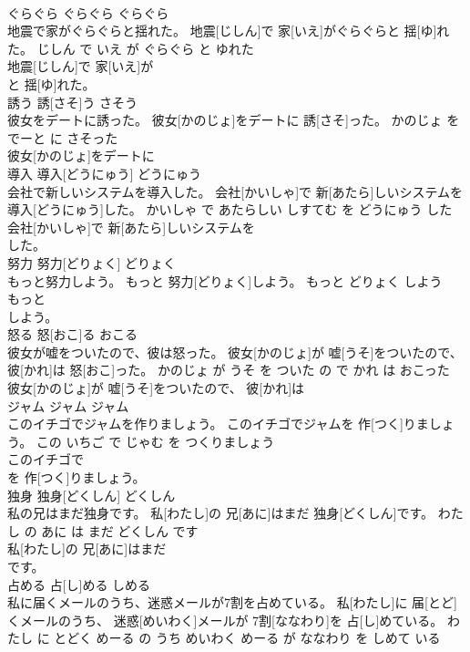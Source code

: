 \documentclass[8pt]{extreport}
\begin{document}
\begin{CJK}{UTF8}{min}
\\	ぐらぐら	ぐらぐら	ぐらぐら	
\\	地震で家がぐらぐらと揺れた。	地震[じしん]で 家[いえ]がぐらぐらと 揺[ゆ]れた。	じしん で いえ が ぐらぐら と ゆれた	
\\	地震[じしん]で 家[いえ]が
\\	と 揺[ゆ]れた。		
\\	誘う	誘[さそ]う	さそう	
\\	彼女をデートに誘った。	彼女[かのじょ]をデートに 誘[さそ]った。	かのじょ を でーと に さそった	
\\	彼女[かのじょ]をデートに
\\	導入	導入[どうにゅう]	どうにゅう	
\\	会社で新しいシステムを導入した。	会社[かいしゃ]で 新[あたら]しいシステムを 導入[どうにゅう]した。	かいしゃ で あたらしい しすてむ を どうにゅう した	
\\	会社[かいしゃ]で 新[あたら]しいシステムを
\\	した。		
\\	努力	努力[どりょく]	どりょく	
\\	もっと努力しよう。	もっと 努力[どりょく]しよう。	もっと どりょく しよう	
\\	もっと
\\	しよう。		
\\	怒る	怒[おこ]る	おこる	
\\	彼女が嘘をついたので、彼は怒った。	彼女[かのじょ]が 嘘[うそ]をついたので、 彼[かれ]は 怒[おこ]った。	かのじょ が うそ を ついた の で かれ は おこった	
\\	彼女[かのじょ]が 嘘[うそ]をついたので、 彼[かれ]は
\\	ジャム	ジャム	ジャム	
\\	このイチゴでジャムを作りましょう。	このイチゴでジャムを 作[つく]りましょう。	この いちご で じゃむ を つくりましょう	
\\	このイチゴで
\\	を 作[つく]りましょう。		
\\	独身	独身[どくしん]	どくしん	
\\	私の兄はまだ独身です。	私[わたし]の 兄[あに]はまだ 独身[どくしん]です。	わたし の あに は まだ どくしん です	
\\	私[わたし]の 兄[あに]はまだ
\\	です。		
\\	占める	占[し]める	しめる	
\\	私に届くメールのうち、迷惑メールが7割を占めている。	私[わたし]に 届[とど]くメールのうち、 迷惑[めいわく]メールが 7割[ななわり]を 占[し]めている。	わたし に とどく めーる の うち めいわく めーる が ななわり を しめて いる	

\end{CJK}
\end{document}
